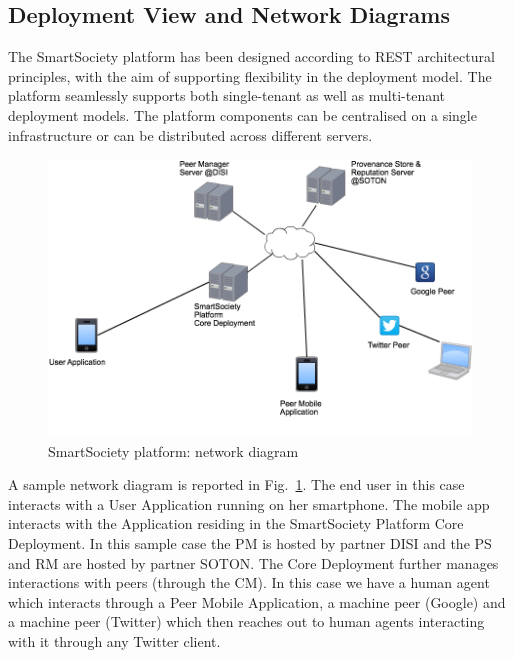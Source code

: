 \subsection{Deployment View and Network Diagrams}
The SmartSociety platform has been designed according to REST architectural principles, with the aim of supporting flexibility in the deployment model. %
The platform seamlessly supports both single-tenant as
well as multi-tenant deployment models. %
The platform components
can be centralised on a single infrastructure or can be distributed
across different servers. 

\begin{figure}[!hbt]
 \centering
 \includegraphics[width=1\textwidth]{figs/netDiagram}
 \caption{SmartSociety platform: network diagram}
 \label{fig:netDiagram}
\end{figure}

A sample network diagram is reported in Fig.~\ref{fig:netDiagram}. The end user in this case interacts with a User Application running on her smartphone. The mobile app interacts with the Application residing in the SmartSociety Platform Core Deployment. %
In this sample case the PM is hosted by partner DISI and the PS and RM are hosted by partner SOTON. The Core Deployment further manages interactions with peers (through the CM). In this case we have a human agent which interacts through a Peer Mobile Application, a machine peer (Google) and a machine peer (Twitter) which then reaches out to human agents interacting with it through any Twitter client.



